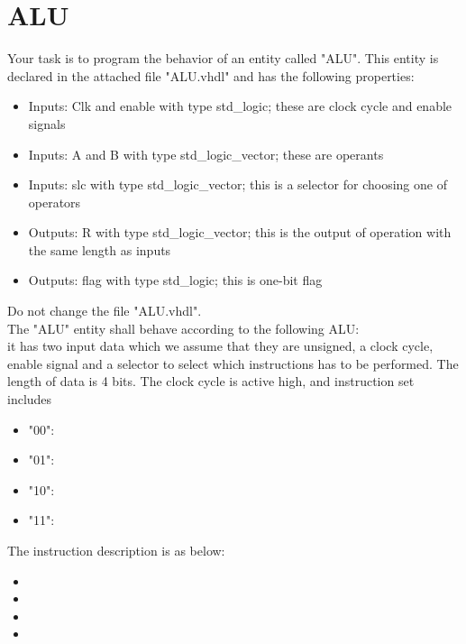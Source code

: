 \documentclass[a4paper,12pt]{article}
\begin{document}
\pagestyle{empty}
\setlength{\parindent}{0em} 
\section*{ALU}

Your task is to program the behavior of an entity called "ALU". This entity is declared in the attached file "ALU.vhdl" and has the following properties:
\begin{itemize}
\item Inputs: Clk and enable with type std\_logic; these are clock cycle and enable signals
\item Inputs: A and B with type std\_logic\_vector; these are operants
\item Inputs: slc with type std\_logic\_vector; this is a selector for choosing one of operators
\item Outputs: R with type std\_logic\_vector; this is the output of operation with the same length as inputs
\item Outputs: flag with type std\_logic; this is one-bit flag
\end{itemize}
\vspace{0.3cm}

Do not change the file "ALU.vhdl".
\\

The "ALU" entity shall behave according to the following ALU:
\\
it has two input data which we assume that they are unsigned, a clock cycle, enable signal and a selector to select which instructions has to be performed. The length of data is 4 bits. The clock cycle is active high, and instruction set includes %
\\
\begin{itemize}
\item "00": %
\item "01": %
\item "10": %
\item "11": %
\end{itemize}
\vspace{0.3cm}

The instruction description is as below:
\begin{itemize}
\item %
\item %
\item %
\item %
\end{itemize}
\vspace{0.3cm}
\end{document}
